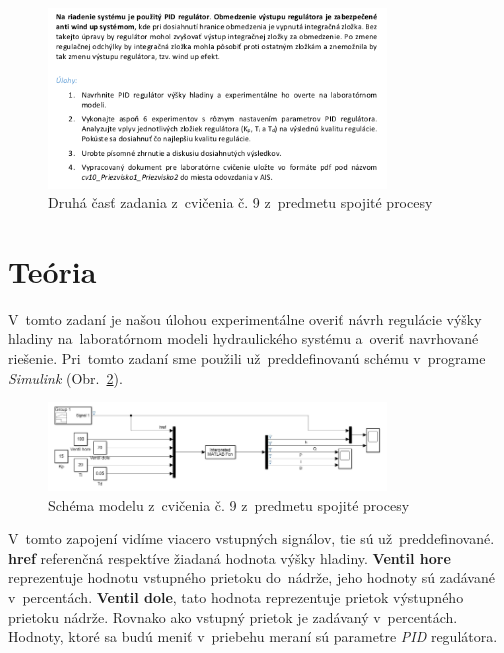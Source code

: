 \documentclass{article}
\begin{document}
\begin{figure}[!htbp]
	\begin{center}
		\includegraphics[width=0.8\textwidth]{./include/zadaniep2.png}
	\end{center}
	\caption{Druhá časť zadania z~cvičenia č. 9 z~predmetu spojité procesy}
		\label{fig:zadanie2}
\end{figure}

\clearpage

\section{Teória}
\label{sec:teoria}

V~tomto zadaní je našou úlohou experimentálne overiť návrh regulácie výšky hladiny na~laboratórnom
modeli hydraulického systému a~overiť navrhované riešenie. Pri~tomto zadaní sme použili už~preddefinovanú schému
v~programe \textit{Simulink} (Obr.~\ref{fig:schema}).

\begin{figure}[!htbp]
	\begin{center}
		\includegraphics[width=0.8\textwidth]{./include/schema.png}
	\end{center}
	\caption{Schéma modelu z~cvičenia č. 9 z~predmetu spojité procesy}
	\label{fig:schema}
\end{figure}

V~tomto zapojení vidíme viacero vstupných signálov, tie sú už~preddefinované. \textbf{href} referenčná respektíve
žiadaná hodnota výšky hladiny. \textbf{Ventil hore} reprezentuje hodnotu vstupného prietoku do~nádrže, jeho hodnoty
sú zadávané v~percentách. \textbf{Ventil dole}, tato hodnota reprezentuje prietok výstupného prietoku nádrže.
Rovnako ako vstupný prietok je zadávaný v~percentách. Hodnoty, ktoré sa budú meniť v~priebehu meraní sú parametre
\textit{PID} regulátora.
\end{document}
